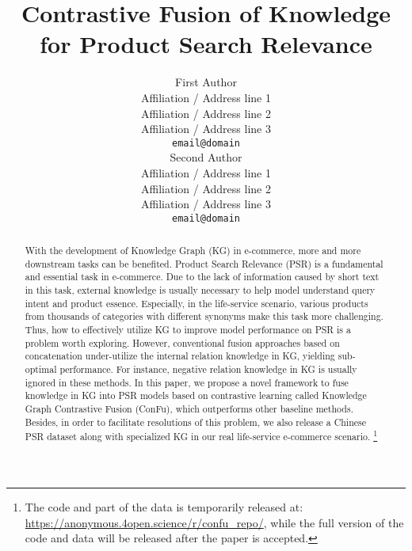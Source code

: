 \documentclass[11pt]{article}
\title{Contrastive Fusion of Knowledge for Product Search Relevance}
\author{First Author \\
  Affiliation / Address line 1 \\
  Affiliation / Address line 2 \\
  Affiliation / Address line 3 \\
  \texttt{email@domain} \\\And
  Second Author \\
  Affiliation / Address line 1 \\
  Affiliation / Address line 2 \\
  Affiliation / Address line 3 \\
\texttt{email@domain} \\}
\begin{document}
\maketitle
\begin{abstract}
  With the development of Knowledge Graph (KG) in e-commerce, more and more downstream tasks can be benefited. 
  Product Search Relevance (PSR) is a fundamental and essential task in e-commerce. 
  Due to the lack of information caused by short text in this task, external knowledge is usually necessary to help model understand query intent and product essence. 
  Especially, in the life-service scenario, various products from thousands of categories with different synonyms make this task more challenging. 
  Thus, how to effectively utilize KG to improve model performance on PSR is a problem worth exploring. 
  However, conventional fusion approaches based on concatenation under-utilize the internal relation knowledge in KG, yielding sub-optimal performance.
  For instance, negative relation knowledge in KG is usually ignored in these methods.
  In this paper, we propose a novel framework to fuse knowledge in KG into PSR models based on contrastive learning called Knowledge Graph Contrastive Fusion (ConFu), which outperforms other baseline methods. 
  Besides, in order to facilitate resolutions of this problem, we also release a Chinese PSR dataset along with specialized KG in our real life-service e-commerce scenario.
  \footnote{The code and part of the data is temporarily released at: \url{https://anonymous.4open.science/r/confu_repo/}, while the full version of the code and data will be released after the paper is accepted.}
\end{abstract}








\end{document}
